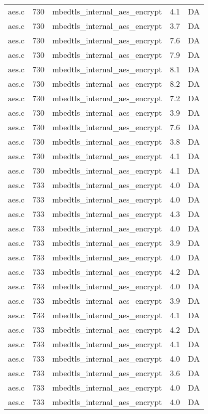 \begin{table}[!ht]
\begin{tabular}{lrlrr}
aes.c& 730&mbedtls\_internal\_aes\_encrypt&4.1 &DA\\
aes.c& 730&mbedtls\_internal\_aes\_encrypt&3.7 &DA\\
aes.c& 730&mbedtls\_internal\_aes\_encrypt&7.6 &DA\\
aes.c& 730&mbedtls\_internal\_aes\_encrypt&7.9 &DA\\
aes.c& 730&mbedtls\_internal\_aes\_encrypt&8.1 &DA\\
aes.c& 730&mbedtls\_internal\_aes\_encrypt&8.2 &DA\\
aes.c& 730&mbedtls\_internal\_aes\_encrypt&7.2 &DA\\
aes.c& 730&mbedtls\_internal\_aes\_encrypt&3.9 &DA\\
aes.c& 730&mbedtls\_internal\_aes\_encrypt&7.6 &DA\\
aes.c& 730&mbedtls\_internal\_aes\_encrypt&3.8 &DA\\
aes.c& 730&mbedtls\_internal\_aes\_encrypt&4.1 &DA\\
aes.c& 730&mbedtls\_internal\_aes\_encrypt&4.1 &DA\\
aes.c& 733&mbedtls\_internal\_aes\_encrypt&4.0 &DA\\
aes.c& 733&mbedtls\_internal\_aes\_encrypt&4.0 &DA\\
aes.c& 733&mbedtls\_internal\_aes\_encrypt&4.3 &DA\\
aes.c& 733&mbedtls\_internal\_aes\_encrypt&4.0 &DA\\
aes.c& 733&mbedtls\_internal\_aes\_encrypt&3.9 &DA\\
aes.c& 733&mbedtls\_internal\_aes\_encrypt&4.0 &DA\\
aes.c& 733&mbedtls\_internal\_aes\_encrypt&4.2 &DA\\
aes.c& 733&mbedtls\_internal\_aes\_encrypt&4.0 &DA\\
aes.c& 733&mbedtls\_internal\_aes\_encrypt&3.9 &DA\\
aes.c& 733&mbedtls\_internal\_aes\_encrypt&4.1 &DA\\
aes.c& 733&mbedtls\_internal\_aes\_encrypt&4.2 &DA\\
aes.c& 733&mbedtls\_internal\_aes\_encrypt&4.1 &DA\\
aes.c& 733&mbedtls\_internal\_aes\_encrypt&4.0 &DA\\
aes.c& 733&mbedtls\_internal\_aes\_encrypt&3.6 &DA\\
aes.c& 733&mbedtls\_internal\_aes\_encrypt&4.0 &DA\\
aes.c& 733&mbedtls\_internal\_aes\_encrypt&4.0 &DA\\

\end{tabular}
\end{table}
